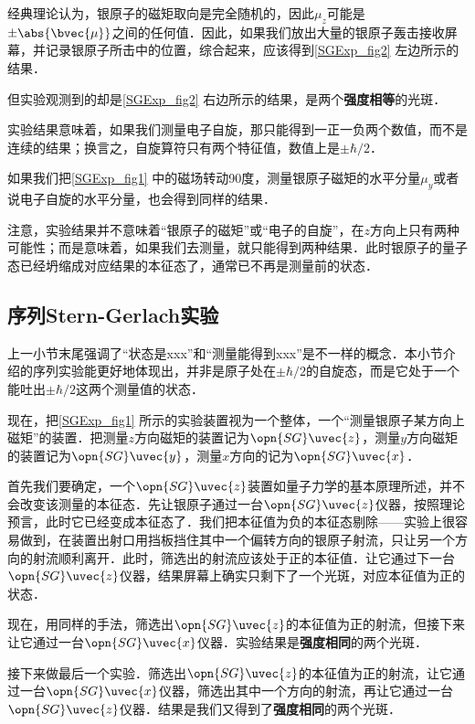 经典理论认为，银原子的磁矩取向是完全随机的，因此$\mu_z$可能是$\pm\abs{\bvec{\mu}}$之间的任何值．因此，如果我们放出大量的银原子轰击接收屏幕，并记录银原子所击中的位置，综合起来，应该得到\autoref{SGExp_fig2} 左边所示的结果．

但实验观测到的却是\autoref{SGExp_fig2} 右边所示的结果，是两个\textbf{强度相等}的光斑．


实验结果意味着，如果我们测量电子自旋，那只能得到一正一负两个数值，而不是连续的结果；换言之，自旋算符只有两个特征值，数值上是$\pm\hbar/2$．


如果我们把\autoref{SGExp_fig1} 中的磁场转动90度，测量银原子磁矩的水平分量$\mu_y$或者说电子自旋的水平分量，也会得到同样的结果．



注意，实验结果并不意味着“银原子的磁矩”或“电子的自旋”，在$z$方向上只有两种可能性；而是意味着，如果我们去测量，就只能得到两种结果．此时银原子的量子态已经坍缩成对应结果的本征态了，通常已不再是测量前的状态．



\subsection{序列Stern-Gerlach实验}\label{SGExp_sub1}

上一小节末尾强调了“状态是xxx”和“测量能得到xxx”是不一样的概念．本小节介绍的序列实验能更好地体现出，并非是原子处在$\pm\hbar/2$的自旋态，而是它处于一个能吐出$\pm\hbar/2$这两个测量值的状态．

现在，把\autoref{SGExp_fig1} 所示的实验装置视为一个整体，一个“测量银原子某方向上磁矩”的装置．把测量$z$方向磁矩的装置记为$\opn{SG}\uvec{z}$，测量$y$方向磁矩的装置记为$\opn{SG}\uvec{y}$，测量$x$方向的记为$\opn{SG}\uvec{x}$．

首先我们要确定，一个$\opn{SG}\uvec{z}$装置如量子力学的基本原理所述，并不会改变该测量的本征态．先让银原子通过一台$\opn{SG}\uvec{z}$仪器，按照理论预言，此时它已经变成本征态了．我们把本征值为负的本征态剔除——实验上很容易做到，在装置出射口用挡板挡住其中一个偏转方向的银原子射流，只让另一个方向的射流顺利离开．此时，筛选出的射流应该处于正的本征值．让它通过下一台$\opn{SG}\uvec{z}$仪器，结果屏幕上确实只剩下了一个光斑，对应本征值为正的状态．

现在，用同样的手法，筛选出$\opn{SG}\uvec{z}$的本征值为正的射流，但接下来让它通过一台$\opn{SG}\uvec{x}$仪器．实验结果是\textbf{强度相同}的两个光斑．

接下来做最后一个实验．筛选出$\opn{SG}\uvec{z}$的本征值为正的射流，让它通过一台$\opn{SG}\uvec{x}$仪器，筛选出其中一个方向的射流，再让它通过一台$\opn{SG}\uvec{z}$仪器．结果是我们又得到了\textbf{强度相同}的两个光斑．




